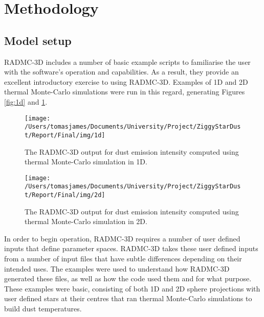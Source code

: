 \documentclass{report}
\begin{document}
\section{Methodology}

\subsection{Model setup}
RADMC-3D includes a number of basic example scripts to familiarise the user with the software's operation and capabilities. As a result, they provide an excellent introductory exercise to using RADMC-3D. Examples of 1D and 2D thermal Monte-Carlo simulations were run in this regard, generating Figures \ref{fig:1d} and \ref{fig:2d}.

\begin{figure}[!htb]
  \texttt{[image: /Users/tomasjames/Documents/University/Project/ZiggyStarDust/Report/Final/img/1d]}
  \caption{The RADMC-3D output for dust emission intensity computed using thermal Monte-Carlo simulation in 1D.}\label{fig:1d}
\endminipage\hfill
{}
  \texttt{[image: /Users/tomasjames/Documents/University/Project/ZiggyStarDust/Report/Final/img/2d]}
  \caption{The RADMC-3D output for dust emission intensity computed using thermal Monte-Carlo simulation in 2D.}\label{fig:2d}
\endminipage
\end{figure}

In order to begin operation, RADMC-3D requires a number of user defined inputs that define parameter spaces. RADMC-3D takes these user defined inputs from a number of input files that have subtle differences depending on their intended uses. The examples were used to understand how RADMC-3D generated these files, as well as how the code used them and for what purpose. These examples were basic, consisting of both 1D and 2D sphere projections with user defined stars at their centres that ran thermal Monte-Carlo simulations to build dust temperatures.
\end{document}
